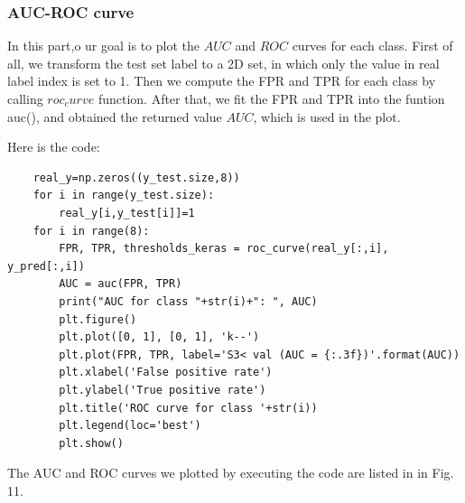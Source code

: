\documentclass[conference]{IEEEtran}
\begin{document}
\subsubsection{AUC-ROC curve}
In this part,o ur goal is to plot the $AUC$ and $ROC$ curves for each class.
First of all, we transform the test set label to a 2D set, in which only the value in real label index is set to 1.
Then we compute the FPR and TPR for each class by calling $roc_curve$ function.
After that, we fit the FPR and TPR into the funtion auc(), and obtained the returned value $AUC$, which is used in the plot.\par
Here is the code:
\begin{lstlisting}
    real_y=np.zeros((y_test.size,8))
    for i in range(y_test.size):
        real_y[i,y_test[i]]=1
    for i in range(8):
        FPR, TPR, thresholds_keras = roc_curve(real_y[:,i], y_pred[:,i]) 
        AUC = auc(FPR, TPR)  
        print("AUC for class "+str(i)+": ", AUC)
        plt.figure()
        plt.plot([0, 1], [0, 1], 'k--')
        plt.plot(FPR, TPR, label='S3< val (AUC = {:.3f})'.format(AUC))
        plt.xlabel('False positive rate')
        plt.ylabel('True positive rate')
        plt.title('ROC curve for class '+str(i))
        plt.legend(loc='best')
        plt.show()    
\end{lstlisting}

The AUC and ROC curves we plotted by executing the code are listed in in Fig. 11.
\end{document}
